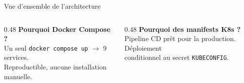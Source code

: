 \documentclass[aspectratio=169, 11pt]{beamer}
\begin{document}
\begin{frame}[fragile]{Vue d'ensemble de l'architecture}
\begin{tikzpicture}
\end{tikzpicture}

\vspace{6pt}
\begin{columns}[T]
  \begin{column}{0.48\textwidth}
    \footnotesize
    \textbf{Pourquoi Docker Compose ?}\\
    Un seul \texttt{docker compose up} $\to$ 9 services.\\
    Reproductible, aucune installation manuelle.
  \end{column}
  \begin{column}{0.48\textwidth}
    \footnotesize
    \textbf{Pourquoi des manifests K8s ?}\\
    Pipeline CD pr\^et pour la production. D\'eploiement\\
    conditionnel au secret \texttt{KUBECONFIG}.
  \end{column}
\end{columns}

\end{frame}
\end{document}
